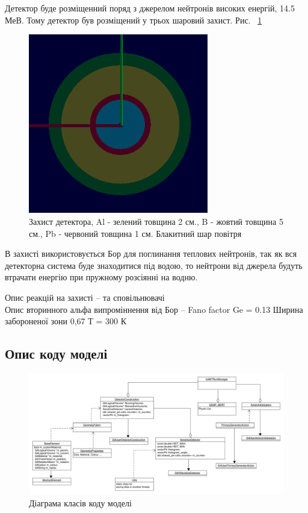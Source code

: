 \documentclass[a4paper, 14pt]{article}
\numberwithin{equation}{section}
\numberwithin{table}{section}
\begin{document}
	Детектор буде розміщенний поряд з джерелом нейтронів високих енергій, 14.5 МеВ. Тому детектор був розміщений у трьох шаровий захист. Рис. ~\ref{ris:s_detector_P}
	
	\begin{figure}[hbt!]
		\centering \includegraphics[width=0.7\textwidth]{images/dectorPrt.png}
		\caption{Захист детектора, Al - зелений товщина 2 см., B - жовтий товщина 5 см., Pb - червоний товщина 1 см. Блакитний шар повітря} 
		\label{ris:s_detector_P}	
	\end{figure} 

	В захисті використовується Бор для поглинання теплових нейтронів, так як вся детекторна система буде знаходитися під водою, то нейтрони від джерела будуть втрачати енергію при пружному розсіянні на водню. 
	
	Опис реакцій на захисті -- та сповільнювачі \\
	Опис вторинного альфа випроміннення від Бор --
	Fano factor Ge = 0.13 
	Ширина забороненої зони 0,67 Т = 300 К
	
\subsection{Опис коду моделі}

	\begin{figure}[hbt!]
		\centering \includegraphics[width=1\textwidth]{res/classDiagram.pdf}
		\caption{Діаграма класів коду моделі} 
		\label{ris:s_classDiagram}	
	\end{figure} 
\end{document}
